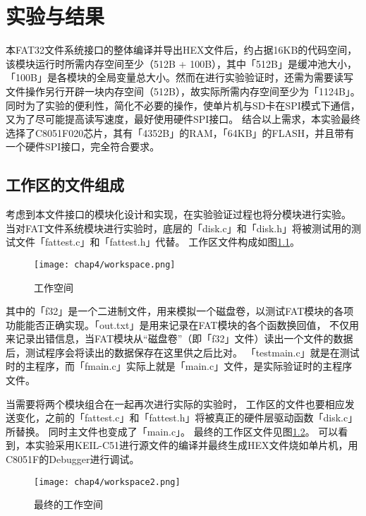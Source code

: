 
\chapter{实验与结果}
\label{chap:Results}
本FAT32文件系统接口的整体编译并导出HEX文件后，约占据16KB的代码空间，该模块运行时所需内存空间至少（512B + 100B），其中「512B」是缓冲池大小，
「100B」是各模块的全局变量总大小。然而在进行实验验证时，还需为需要读写文件操作另行开辟一块内存空间（512B），故实际所需内存空间至少为「1124B」。
同时为了实验的便利性，简化不必要的操作，使单片机与SD卡在SPI模式下通信，又为了尽可能提高读写速度，最好使用硬件SPI接口。
结合以上需求，本实验最终选择了C8051F020芯片，其有「4352B」的RAM，「64KB」的FLASH，并且带有一个硬件SPI接口，完全符合要求。

\section{工作区的文件组成}
\label{sec:Workspace}
考虑到本文件接口的模块化设计和实现，在实验验证过程也将分模块进行实验。
当对FAT文件系统模块进行实验时，底层的「disk.c」和「disk.h」将被测试用的测试文件「fattest.c」和「fattest.h」代替。
工作区文件构成如图\ref{fig:wsp1}。

\begin{figure}[!htbp]
    \centering
    \texttt{[image: chap4/workspace.png]}
    \\
    \caption{工作空间} \label{fig:wsp1}
\end{figure}

其中的「f32」是一个二进制文件，用来模拟一个磁盘卷，以测试FAT模块的各项功能能否正确实现。「out.txt」是用来记录在FAT模块的各个函数换回值，
不仅用来记录出错信息，当FAT模块从“磁盘卷”（即「f32」文件）读出一个文件的数据后，测试程序会将读出的数据保存在这里供之后比对。
「testmain.c」就是在测试时的主程序，而「fmain.c」实际上就是「main.c」文件，是实际验证时的主程序文件。

当需要将两个模块组合在一起再次进行实际的实验时，
工作区的文件也要相应发送变化，之前的「fattest.c」和「fattest.h」将被真正的硬件层驱动函数「disk.c」所替换。
同时主文件也变成了「main.c」。
最终的工作区文件见图\ref{fig:wsp2}。
可以看到，本实验采用KEIL-C51进行源文件的编译并最终生成HEX文件烧如单片机，用C8051F的Debugger进行调试。

\begin{figure}[!htbp]
    \centering
    \texttt{[image: chap4/workspace2.png]}
    \\
    \caption{最终的工作空间} \label{fig:wsp2}
\end{figure}

